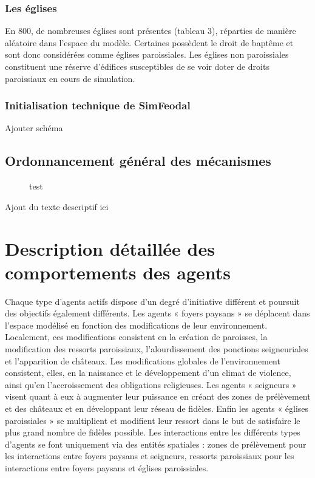 \subsubsection{Les églises}

En 800, de nombreuses églises sont présentes (tableau 3), réparties de manière aléatoire dans l'espace du modèle. 
Certaines possèdent le droit de baptême et sont donc considérées comme églises paroissiales.
Les églises non paroissiales constituent une réserve d'édifices susceptibles de se voir doter de droits paroissiaux en cours de simulation.

\subsubsection{Initialisation technique de SimFeodal}

Ajouter schéma

\subsection{Ordonnancement général des mécanismes}

\begin{figure}[H]
	
	\caption{test}
\end{figure}

Ajout du texte descriptif ici

	
\section[Comportements des agents]{Description détaillée des comportements des agents}

Chaque type d'agents actifs dispose d'un degré d'initiative différent et poursuit des objectifs également différents.
Les agents « foyers paysans » se déplacent dans l'espace modélisé en fonction des modifications de leur environnement.
Localement, ces modifications consistent en la création de paroisses, la modification des ressorts paroissiaux, l'alourdissement des ponctions seigneuriales et l'apparition de châteaux.
Les modifications globales de l'environnement consistent, elles, en la naissance et le développement d'un climat de violence, ainsi qu'en l'accroissement des obligations religieuses.
Les agents « seigneurs » visent quant à eux à augmenter leur puissance en créant des zones de prélèvement et des châteaux et en développant leur réseau de fidèles.
Enfin les agents « églises paroissiales » se multiplient et modifient leur ressort dans le but de satisfaire le plus grand nombre de fidèles possible.
Les interactions entre les différents types d'agents se font uniquement via des entités spatiales : zones de prélèvement pour les interactions entre foyers paysans et seigneurs, ressorts paroissiaux pour les interactions entre foyers paysans et églises paroissiales.

